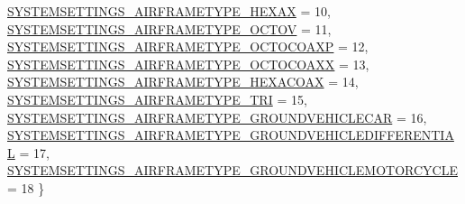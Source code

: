 \begin{DoxyCompactItemize}
\hyperlink{group___system_settings_ggaa057b963d0a405dc7e785305135c4e07a08266264d1a4b28797060bb072b9f773}{\-S\-Y\-S\-T\-E\-M\-S\-E\-T\-T\-I\-N\-G\-S\-\_\-\-A\-I\-R\-F\-R\-A\-M\-E\-T\-Y\-P\-E\-\_\-\-H\-E\-X\-A\-X} = 10, 
\hyperlink{group___system_settings_ggaa057b963d0a405dc7e785305135c4e07a04e0983ed2ea31a5106371d6f0fd60a0}{\-S\-Y\-S\-T\-E\-M\-S\-E\-T\-T\-I\-N\-G\-S\-\_\-\-A\-I\-R\-F\-R\-A\-M\-E\-T\-Y\-P\-E\-\_\-\-O\-C\-T\-O\-V} = 11, 
\*
\hyperlink{group___system_settings_ggaa057b963d0a405dc7e785305135c4e07a1d63f7c8a00e5967c81e14f88f0bec29}{\-S\-Y\-S\-T\-E\-M\-S\-E\-T\-T\-I\-N\-G\-S\-\_\-\-A\-I\-R\-F\-R\-A\-M\-E\-T\-Y\-P\-E\-\_\-\-O\-C\-T\-O\-C\-O\-A\-X\-P} = 12, 
\hyperlink{group___system_settings_ggaa057b963d0a405dc7e785305135c4e07a04c4fe9818e01af5def2e5de7f0ba555}{\-S\-Y\-S\-T\-E\-M\-S\-E\-T\-T\-I\-N\-G\-S\-\_\-\-A\-I\-R\-F\-R\-A\-M\-E\-T\-Y\-P\-E\-\_\-\-O\-C\-T\-O\-C\-O\-A\-X\-X} = 13, 
\hyperlink{group___system_settings_ggaa057b963d0a405dc7e785305135c4e07a8e988fc442dfaaaa4d29dcf774b7628e}{\-S\-Y\-S\-T\-E\-M\-S\-E\-T\-T\-I\-N\-G\-S\-\_\-\-A\-I\-R\-F\-R\-A\-M\-E\-T\-Y\-P\-E\-\_\-\-H\-E\-X\-A\-C\-O\-A\-X} = 14, 
\hyperlink{group___system_settings_ggaa057b963d0a405dc7e785305135c4e07a14f65d66417331c66ca693f3f874a77e}{\-S\-Y\-S\-T\-E\-M\-S\-E\-T\-T\-I\-N\-G\-S\-\_\-\-A\-I\-R\-F\-R\-A\-M\-E\-T\-Y\-P\-E\-\_\-\-T\-R\-I} = 15, 
\*
\hyperlink{group___system_settings_ggaa057b963d0a405dc7e785305135c4e07adc16254d7d54510bd395b487cc3e383c}{\-S\-Y\-S\-T\-E\-M\-S\-E\-T\-T\-I\-N\-G\-S\-\_\-\-A\-I\-R\-F\-R\-A\-M\-E\-T\-Y\-P\-E\-\_\-\-G\-R\-O\-U\-N\-D\-V\-E\-H\-I\-C\-L\-E\-C\-A\-R} = 16, 
\hyperlink{group___system_settings_ggaa057b963d0a405dc7e785305135c4e07a931a15f1623f4fe72cf165b6fb3f39df}{\-S\-Y\-S\-T\-E\-M\-S\-E\-T\-T\-I\-N\-G\-S\-\_\-\-A\-I\-R\-F\-R\-A\-M\-E\-T\-Y\-P\-E\-\_\-\-G\-R\-O\-U\-N\-D\-V\-E\-H\-I\-C\-L\-E\-D\-I\-F\-F\-E\-R\-E\-N\-T\-I\-A\-L} = 17, 
\hyperlink{group___system_settings_ggaa057b963d0a405dc7e785305135c4e07a245db51b597701e0a302cfeb0c268212}{\-S\-Y\-S\-T\-E\-M\-S\-E\-T\-T\-I\-N\-G\-S\-\_\-\-A\-I\-R\-F\-R\-A\-M\-E\-T\-Y\-P\-E\-\_\-\-G\-R\-O\-U\-N\-D\-V\-E\-H\-I\-C\-L\-E\-M\-O\-T\-O\-R\-C\-Y\-C\-L\-E} = 18
 \}
\end{DoxyCompactItemize}
